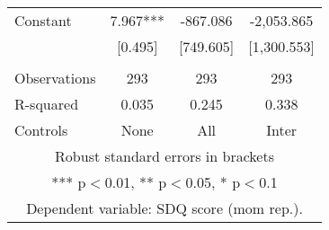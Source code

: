 \begin{tabular}{lccc}
Constant & 7.967*** & -867.086 & -2,053.865 \\
 & [0.495] & [749.605] & [1,300.553] \\
 &  &  &  \\
Observations & 293 & 293 & 293 \\
R-squared & 0.035 & 0.245 & 0.338 \\
 Controls & None & All & Inter \\ \hline
\multicolumn{4}{c}{ Robust standard errors in brackets} \\
\multicolumn{4}{c}{ *** p$<$0.01, ** p$<$0.05, * p$<$0.1} \\
\multicolumn{4}{c}{ Dependent variable: SDQ score (mom rep.).} \\
\end{tabular}
